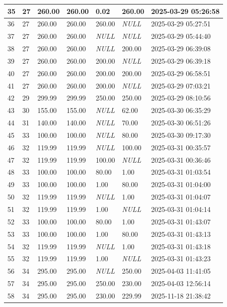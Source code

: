 \begin{longtable}{|l|l|l|l|l|l|l|}
35 & 27 & 260.00 & 260.00 & 0.02 & 260.00 & 2025-03-29 05:26:58 \\ \hline 
36 & 27 & 260.00 & 260.00 & 260.00 & \textit{NULL} & 2025-03-29 05:27:51 \\ \hline 
37 & 27 & 260.00 & 260.00 & \textit{NULL} & \textit{NULL} & 2025-03-29 05:44:40 \\ \hline 
38 & 27 & 260.00 & 260.00 & \textit{NULL} & 200.00 & 2025-03-29 06:39:08 \\ \hline 
39 & 27 & 260.00 & 260.00 & 200.00 & \textit{NULL} & 2025-03-29 06:39:18 \\ \hline 
40 & 27 & 260.00 & 260.00 & 200.00 & 200.00 & 2025-03-29 06:58:51 \\ \hline 
41 & 27 & 260.00 & 260.00 & 200.00 & \textit{NULL} & 2025-03-29 07:03:21 \\ \hline 
42 & 29 & 299.99 & 299.99 & 250.00 & 250.00 & 2025-03-29 08:10:56 \\ \hline 
43 & 30 & 155.00 & 155.00 & \textit{NULL} & 62.00 & 2025-03-30 06:35:29 \\ \hline 
44 & 31 & 140.00 & 140.00 & \textit{NULL} & 70.00 & 2025-03-30 06:51:26 \\ \hline 
45 & 33 & 100.00 & 100.00 & \textit{NULL} & 80.00 & 2025-03-30 09:17:30 \\ \hline 
46 & 32 & 119.99 & 119.99 & \textit{NULL} & 100.00 & 2025-03-31 00:35:57 \\ \hline 
47 & 32 & 119.99 & 119.99 & 100.00 & \textit{NULL} & 2025-03-31 00:36:46 \\ \hline 
48 & 33 & 100.00 & 100.00 & 80.00 & 1.00 & 2025-03-31 01:03:54 \\ \hline 
49 & 33 & 100.00 & 100.00 & 1.00 & 80.00 & 2025-03-31 01:04:00 \\ \hline 
50 & 32 & 119.99 & 119.99 & \textit{NULL} & 1.00 & 2025-03-31 01:04:07 \\ \hline 
51 & 32 & 119.99 & 119.99 & 1.00 & \textit{NULL} & 2025-03-31 01:04:14 \\ \hline 
52 & 33 & 100.00 & 100.00 & 80.00 & 1.00 & 2025-03-31 01:43:07 \\ \hline 
53 & 33 & 100.00 & 100.00 & 1.00 & 80.00 & 2025-03-31 01:43:13 \\ \hline 
54 & 32 & 119.99 & 119.99 & \textit{NULL} & 1.00 & 2025-03-31 01:43:18 \\ \hline 
55 & 32 & 119.99 & 119.99 & 1.00 & \textit{NULL} & 2025-03-31 01:43:23 \\ \hline 
56 & 34 & 295.00 & 295.00 & \textit{NULL} & 250.00 & 2025-04-03 11:41:05 \\ \hline 
57 & 34 & 295.00 & 295.00 & 250.00 & 230.00 & 2025-04-03 12:56:14 \\ \hline 
58 & 34 & 295.00 & 295.00 & 230.00 & 229.99 & 2025-11-18 21:38:42 \\ \hline 
 \end{longtable}

